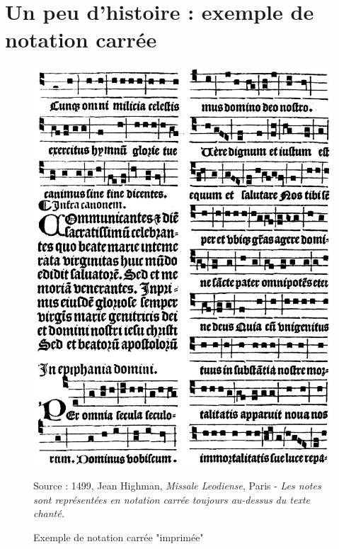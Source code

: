 \section{Un peu d'histoire : exemple de notation carrée}
\label{sec:exempleNotationCarree}
\begin{figure}[H]
	\centering
	\includegraphics[keepaspectratio=true, width=\textwidth]{Annexes/i/notationCarree.jpg}
	\caption{Exemple de notation carrée "imprimée"}
	\medskip
	\small
	Source : 1499, Jean Highman, \textit{Missale Leodiense}, Paris - \textit{Les notes sont représentées en notation carrée toujours au-dessus du texte chanté.}
	\label{fig:notationCarree}
\end{figure}
\clearpage




